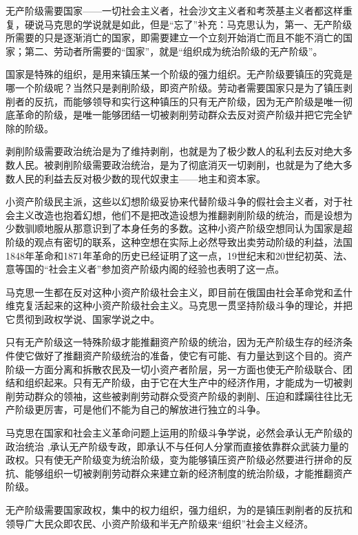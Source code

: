 无产阶级需要国家——一切社会主义者，社会沙文主义者和考茨基主义者都这样重复，硬说马克思的学说就是如此，但是“{\kaishu 忘了}”补充：马克思认为，第一、无产阶级所需要的只是逐渐消亡的国家，即需要建立一个立刻开始消亡而且不能不消亡的国家；第二、劳动者所需要的“国家”，就是“组织成为统治阶级的无产阶级”。

国家是特殊的组织，是用来镇压某一个阶级的强力组织。无产阶级要镇压的究竟是哪一个阶级呢？当然只是剥削阶级，即资产阶级。劳动者需要国家只是为了镇压剥削者的反抗，而能够领导和实行这种镇压的只有无产阶级，因为无产阶级是唯一彻底革命的阶级，是唯一能够团结一切被剥削劳动群众去反对资产阶级并把它完全铲除的阶级。

剥削阶级需要政治统治是为了维持剥削，也就是为了极少数人的私利去反对绝大多数人民。被剥削阶级需要政治统治，是为了彻底消灭一切剥削，也就是为了绝大多数人民的利益去反对极少数的现代奴隶主——地主和资本家。

小资产阶级民主派，这些以幻想阶级妥协来代替阶级斗争的假社会主义者，对于社会主义改造也抱着幻想，他们不是把改造设想为推翻剥削阶级的统治，而是设想为少数驯顺地服从那意识到了本身任务的多数。这种小资产阶级空想同认为国家是超阶级的观点有密切的联系，这种空想在实际上必然导致出卖劳动阶级的利益，法国1848年革命和1871年革命的历史已经证明了这一点，19世纪末和20世纪初英、法、意等国的“社会主义者”参加资产阶级内阁的经验也表明了这一点。

马克思一生都在反对这种小资产阶级社会主义，即目前在俄国由社会革命党和孟什维克复活起来的这种小资产阶级社会主义。马克思一贯坚持阶级斗争的理论，并把它贯彻到政权学说、国家学说之中。

只有无产阶级这一特殊阶级才能推翻资产阶级的统治，因为无产阶级生存的经济条件使它做好了推翻资产阶级统治的准备，使它有可能、有力量达到这个目的。资产阶级一方面分离和拆散农民及一切小资产者阶层，另一方面也使无产阶级联合、团结和组织起来。只有无产阶级，由于它在大生产中的经济作用，才能成为{\kaishu 一切}被剥削劳动群众的领袖，这些被剥削劳动群众受资产阶级的剥削、压迫和蹂躏往往比无产阶级更厉害，可是他们不能为自己的解放进行{\kaishu 独立}的斗争。

马克思在国家和社会主义革命问题上运用的阶级斗争学说，必然会承认无产阶级的{\kaishu 政治统治} ,承认无产阶级专政，即承认不与任何人分掌而直接依靠群众武装力量的政权。只有使无产阶级变为{\kaishu 统治阶级}，变为能够镇压资产阶级必然要进行拼命的反抗、能够组织{\kaishu 一切}被剥削劳动群众来建立新的经济制度的统治阶级，才能推翻资产阶级。

无产阶级需要国家政权，集中的权力组织，强力组织，为的是镇压剥削者的反抗和{\kaishu 领导}广大民众即农民、小资产阶级和半无产阶级来“组织”社会主义经济。

